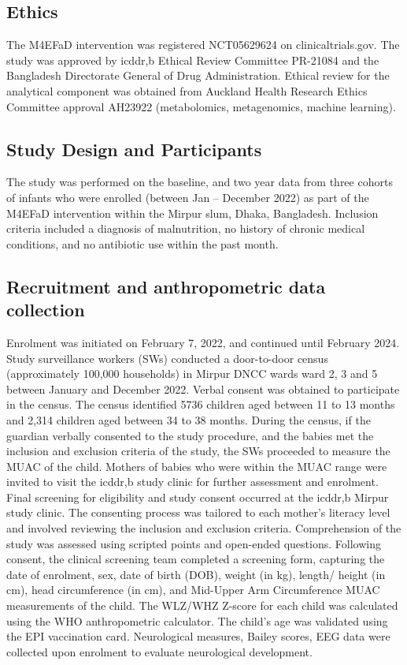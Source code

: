 \documentclass{article}
\begin{document}
\subsection*{Ethics}
The M4EFaD intervention was registered NCT05629624 on clinicaltrials.gov.
The study was approved by icddr,b Ethical Review Committee PR-21084 and the Bangladesh Directorate General of Drug Administration.
Ethical review for the analytical component was obtained from Auckland Health Research Ethics Committee approval AH23922 (metabolomics, metagenomics, machine learning).

\subsection*{Study Design and Participants}
The study was performed on the baseline, and two year data from three cohorts of infants who were enrolled (between Jan – December 2022) as part of the M4EFaD intervention within the Mirpur slum, Dhaka, Bangladesh.
Inclusion criteria included a diagnosis of malnutrition, no history of chronic medical conditions, and no antibiotic use within the past month.

\subsection*{Recruitment and anthropometric data collection}
Enrolment was initiated on February 7, 2022, and continued until February 2024.
Study surveillance workers (SWs) conducted a door-to-door census (approximately 100,000 households) in Mirpur DNCC wards ward 2, 3 and 5 between January and December 2022.
Verbal consent was obtained to participate in the census.
The census identified 5736 children aged between 11 to 13 months and 2,314 children aged between 34 to 38 months.
During the census, if the guardian verbally consented to the study procedure, and the babies met the inclusion and exclusion criteria of the study, the SWs proceeded to measure the MUAC of the child.
Mothers of babies who were within the MUAC range were invited to visit the icddr,b study clinic for further assessment and enrolment.
Final screening for eligibility and study consent occurred at the icddr,b Mirpur study clinic.
The consenting process was tailored to each mother's literacy level and involved reviewing the inclusion and exclusion criteria.
Comprehension of the study was assessed using scripted points and open-ended questions.
Following consent, the clinical screening team completed a screening form, capturing the date of enrolment, sex, date of birth (DOB), weight (in kg), length/ height (in cm), head circumference (in cm), and Mid-Upper Arm Circumference MUAC measurements of the child.
The WLZ/WHZ Z-score for each child was calculated using the WHO anthropometric calculator.
The child's age was validated using the EPI vaccination card.
Neurological measures, Bailey scores, EEG data were collected upon enrolment to evaluate neurological development.
\end{document}

